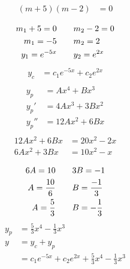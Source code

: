\documentclass[exam=2]{math252exam}
\begin{document}
\begin{problems}
{\begin{equation*}
\begin{aligned}
		(m+5)(m-2) &= 0\\
	\end{aligned}
	\end{equation*}\begin{equation*}
	\begin{aligned}
		m_{1}+5=0 \mbox{{ }{ }{ }} & \mbox{{ }{ }{ }} m_{2}-2=0\\
		m_{1}=-5 \mbox{{ }{ }{ }} & \mbox{{ }{ }{ }} m_{2}=2\\
		y_{1}=e^{-5x} \mbox{{ }{ }{ }} & \mbox{{ }{ }{ }} y_{2}=e^{2x}\\
	\end{aligned}
	\end{equation*}\begin{equation*}
	\begin{aligned}
		y_{c} &= c_{1}e^{-5x} + c_{2}e^{2x}\\
	\end{aligned}
	\end{equation*}\begin{equation*}
	\begin{aligned}
		y_{p} &= Ax^{4} + Bx^{3}\\
		y_{p}' &= 4Ax^{3} + 3Bx^{2}\\
		y_{p}'' &= 12Ax^{2} + 6Bx\\
	\end{aligned}
	\end{equation*}\begin{equation*}
	\begin{aligned}
		12Ax^{2} + 6Bx &= 20x^{2} - 2x\\
		6Ax^{2} + 3Bx &= 10x^{2} - x\\
	\end{aligned}
	\end{equation*}\begin{equation*}
	\begin{aligned}
		6A = 10 \mbox{{ }{ }{ }} & \mbox{{ }{ }{ }} 3B = -1\\
		A = \frac{10}{6} \mbox{{ }{ }{ }} & \mbox{{ }{ }{ }} B = \frac{-1}{3}\\
		A = \frac{5}{3} \mbox{{ }{ }{ }} & \mbox{{ }{ }{ }} B = -\frac{1}{3}\\
	\end{aligned}
	\end{equation*}\begin{equation*}
	\begin{aligned}
		y_{p} &= \frac{5}{3}x^{4} - \frac{1}{3}x^{3}\\
		y &= y_{c} + y_{p}\\
		  &= c_{1}e^{-5x} + c_{2}e^{2x} + \frac{5}{3}x^{4} - \frac{1}{3}x^{3}\\
	\end{aligned}

\end{equation*}}
\end{problems}
\end{document}
